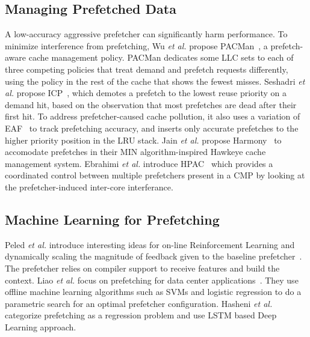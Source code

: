 
\subsection{Managing Prefetched Data}


A low-accuracy aggressive prefetcher can significantly harm
performance.  To minimize interference from prefetching, Wu \textit{et
  al.} propose PACMan~\cite{pacman}, a prefetch-aware cache management
policy. PACMan dedicates some LLC sets to each of three competing
policies that treat demand and prefetch requests differently, using
the policy in the rest of the cache that shows the fewest
misses. Seshadri \textit{et al.} propose ICP~\cite{icp}, which demotes
a prefetch to the lowest reuse priority on a demand hit, based on the
observation that most prefetches are dead after their first hit. To
address prefetcher-caused cache pollution, it also uses a variation of
EAF~\cite{eaf} to track prefetching accuracy, and inserts only
accurate prefetches to the higher priority position in the LRU
stack. Jain \textit{et al.} propose Harmony~\cite{Harmony} to
accomodate prefetches in their MIN algorithm-inspired Hawkeye cache
management system. {\color{red}Ebrahimi \textit{et al.} introduce
HPAC~\cite{HPAC} which provides a coordinated control between 
multiple prefetchers present in a CMP by looking at the 
prefetcher-induced inter-core interferance.}

\subsection{Machine Learning for Prefetching}

Peled \textit{et al.} introduce interesting ideas for on-line
Reinforcement Learning and dynamically scaling the magnitude of
feedback given to the baseline prefetcher~\cite{Semantics}. The
prefetcher relies on compiler support to receive features and build
the context.  Liao \textit{et al.}  focus on prefetching for data
center applications~\cite{Datacenter}.  They use offline machine
learning algorithms such as SVMs and logistic regression to do a
parametric search for an optimal prefetcher configuration. 
{\color{red}Hasheni \textit{et al.}~\cite{LSTM} categorize 
prefetching as a regression problem and use LSTM based Deep 
Learning approach.}

